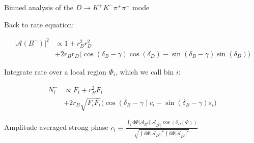 \documentclass{beamer}
\begin{document}
\begin{frame}{Binned analysis of the $D\to K^+K^-\pi^+\pi^-$ mode}
  \begin{center}
    \Large Back to rate equation:
  \end{center}
  \vspace{-0.3cm}
  \begin{align*}
    \lvert\mathcal{A}(B^-)\lvert^2&\propto1 + r_B^2r_D^2 \\
    &+ 2r_Br_D\big(\cos(\delta_B - \gamma)\cos(\delta_D) - \sin(\delta_B - \gamma)\sin(\delta_D)\big)
  \end{align*}
  \vspace{-0.7cm}
  \begin{center}
    \Large Integrate rate over a local region $\Phi_i$, which we call bin $i$:
  \end{center}
  \vspace{-0.3cm}
  \begin{align*}
    N_i^-&\propto F_i + r_B^2\bar{F_i} \\
    &+ 2r_B\sqrt{F_i\bar{F_i}}\big(\cos(\delta_B - \gamma)c_i - \sin(\delta_B - \gamma)s_i\big)
  \end{align*}
  \vspace{-0.7cm}
  \begin{center}
    \begin{minipage}{6cm}
      \begin{block}{\centering Amplitude averaged strong phase}
        \centering
        $c_i\equiv\frac{\int_i\mathrm{d}\Phi\lvert\mathcal{A}_{D^0}\lvert\lvert\mathcal{A}_{\bar{D^0}\lvert}\cos(\delta_D(\Phi))}{\sqrt{\int\mathrm{d}\Phi\lvert\mathcal{A}_{D^0}\lvert^2\int\mathrm{d}\Phi\lvert\mathcal{A}_{\bar{D^0}}\lvert^2}}$
      \end{block}
    \end{minipage}
  \end{center}
\end{frame}
\end{document}
